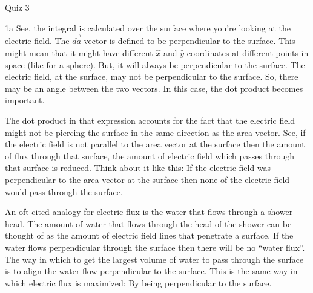 \begin{homeworkProblem}{Quiz 3}
\begin{homeworkSection}{1a}
        See, the integral is calculated over the surface where you're
        looking at the electric field. The $\vec{da}$ vector is defined
        to be perpendicular to the surface. This might mean that it
        might have different $\hat{x}$ and $\hat{y}$ coordinates at
        different points in space (like for a sphere). But, it will
        always be perpendicular to the surface. The electric field, at
        the surface, may not be perpendicular to the surface. So, there
        may be an angle between the two vectors. In this case, the dot
        product becomes important.

        The dot product in that expression accounts for the fact that
        the electric field might not be piercing the surface in the same
        direction as the area vector. See, if the electric field is not
        parallel to the area vector at the surface %
        then the amount of flux through that surface, the amount of
        electric field which passes through that surface is reduced.
        Think about it like this: If the electric field was
        perpendicular to the area vector at the surface then none of the
        electric field would pass through the surface.
        
        An oft-cited analogy for electric flux is the water that flows
        through a shower head. The amount of water that flows through
        the head of the shower can be thought of as the amount of
        electric field lines that penetrate a surface. If the water
        flows perpendicular through the surface then there will be no
        ``water flux''. The way in which to get the largest volume of
        water to pass through the surface is to align the water flow
        perpendicular to the surface. This is the same way in which
        electric flux is maximized: By being perpendicular to the
        surface.


\end{homeworkSection}
\end{homeworkProblem}
